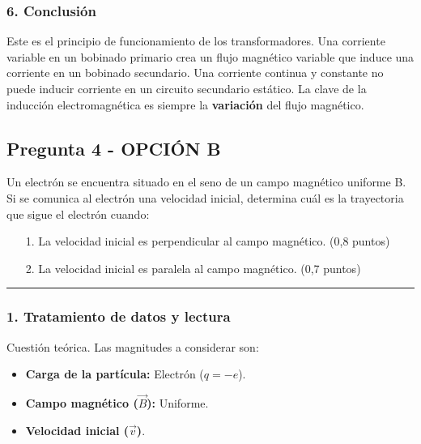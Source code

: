 \subsubsection*{6. Conclusión}
\begin{cajaconclusion}
Este es el principio de funcionamiento de los transformadores. Una corriente variable en un bobinado primario crea un flujo magnético variable que induce una corriente en un bobinado secundario. Una corriente continua y constante no puede inducir corriente en un circuito secundario estático. La clave de la inducción electromagnética es siempre la \textbf{variación} del flujo magnético.
\end{cajaconclusion}

\newpage

\subsection{Pregunta 4 - OPCIÓN B}
\label{subsec:4B_2002_sep_ext}

\begin{cajaenunciado}
Un electrón se encuentra situado en el seno de un campo magnético uniforme B. Si se comunica al electrón una velocidad inicial, determina cuál es la trayectoria que sigue el electrón cuando:
\begin{enumerate}
    \item[1.] La velocidad inicial es perpendicular al campo magnético. (0,8 puntos)
    \item[2.] La velocidad inicial es paralela al campo magnético. (0,7 puntos)
\end{enumerate}
\end{cajaenunciado}
\hrule

\subsubsection*{1. Tratamiento de datos y lectura}
Cuestión teórica. Las magnitudes a considerar son:
\begin{itemize}
    \item \textbf{Carga de la partícula:} Electrón ($q = -e$).
    \item \textbf{Campo magnético ($\vec{B}$):} Uniforme.
    \item \textbf{Velocidad inicial ($\vec{v}$)}.
\end{itemize}

